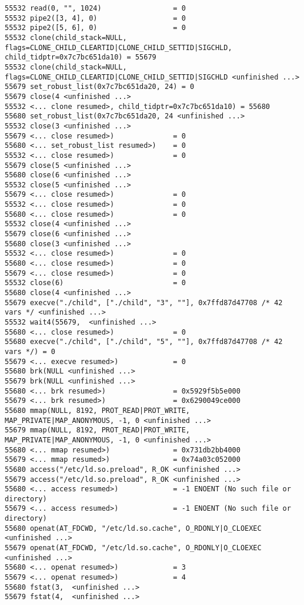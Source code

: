 \begin{verbatim}
55532 read(0, "", 1024)                 = 0
55532 pipe2([3, 4], 0)                  = 0
55532 pipe2([5, 6], 0)                  = 0
55532 clone(child_stack=NULL, flags=CLONE_CHILD_CLEARTID|CLONE_CHILD_SETTID|SIGCHLD, child_tidptr=0x7c7bc651da10) = 55679
55532 clone(child_stack=NULL, flags=CLONE_CHILD_CLEARTID|CLONE_CHILD_SETTID|SIGCHLD <unfinished ...>
55679 set_robust_list(0x7c7bc651da20, 24) = 0
55679 close(4 <unfinished ...>
55532 <... clone resumed>, child_tidptr=0x7c7bc651da10) = 55680
55680 set_robust_list(0x7c7bc651da20, 24 <unfinished ...>
55532 close(3 <unfinished ...>
55679 <... close resumed>)              = 0
55680 <... set_robust_list resumed>)    = 0
55532 <... close resumed>)              = 0
55679 close(5 <unfinished ...>
55680 close(6 <unfinished ...>
55532 close(5 <unfinished ...>
55679 <... close resumed>)              = 0
55532 <... close resumed>)              = 0
55680 <... close resumed>)              = 0
55532 close(4 <unfinished ...>
55679 close(6 <unfinished ...>
55680 close(3 <unfinished ...>
55532 <... close resumed>)              = 0
55680 <... close resumed>)              = 0
55679 <... close resumed>)              = 0
55532 close(6)                          = 0
55680 close(4 <unfinished ...>
55679 execve("./child", ["./child", "3", ""], 0x7ffd87d47708 /* 42 vars */ <unfinished ...>
55532 wait4(55679,  <unfinished ...>
55680 <... close resumed>)              = 0
55680 execve("./child", ["./child", "5", ""], 0x7ffd87d47708 /* 42 vars */) = 0
55679 <... execve resumed>)             = 0
55680 brk(NULL <unfinished ...>
55679 brk(NULL <unfinished ...>
55680 <... brk resumed>)                = 0x5929f5b5e000
55679 <... brk resumed>)                = 0x6290049ce000
55680 mmap(NULL, 8192, PROT_READ|PROT_WRITE, MAP_PRIVATE|MAP_ANONYMOUS, -1, 0 <unfinished ...>
55679 mmap(NULL, 8192, PROT_READ|PROT_WRITE, MAP_PRIVATE|MAP_ANONYMOUS, -1, 0 <unfinished ...>
55680 <... mmap resumed>)               = 0x731db2bb4000
55679 <... mmap resumed>)               = 0x74a03c052000
55680 access("/etc/ld.so.preload", R_OK <unfinished ...>
55679 access("/etc/ld.so.preload", R_OK <unfinished ...>
55680 <... access resumed>)             = -1 ENOENT (No such file or directory)
55679 <... access resumed>)             = -1 ENOENT (No such file or directory)
55680 openat(AT_FDCWD, "/etc/ld.so.cache", O_RDONLY|O_CLOEXEC <unfinished ...>
55679 openat(AT_FDCWD, "/etc/ld.so.cache", O_RDONLY|O_CLOEXEC <unfinished ...>
55680 <... openat resumed>)             = 3
55679 <... openat resumed>)             = 4
55680 fstat(3,  <unfinished ...>
55679 fstat(4,  <unfinished ...>

\end{verbatim}
